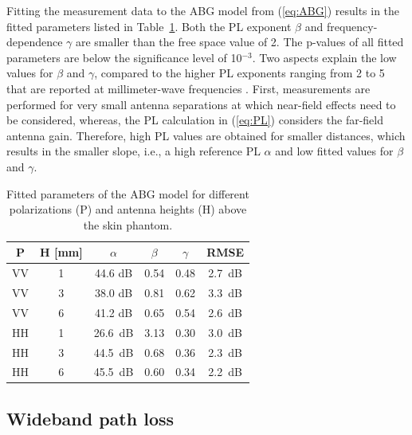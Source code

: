 \documentclass[preprint]{rsl}
\begin{document}
Fitting the measurement data to the ABG model from (\ref{eq:ABG}) results in the fitted parameters listed in Table~\ref{table:ABG}. 
Both the PL exponent $\beta$ and frequency-dependence $\gamma$ are smaller than the free space value of 2. 
The p-values of all fitted parameters are below the significance level of 10$^{-3}$. 
Two aspects explain the low values for $\beta$ and $\gamma$, compared to the higher PL exponents ranging from 2 to 5 that are reported at millimeter-wave frequencies \cite{Petrillo2014, Aminzadeh2021_tap}. 
First, measurements are performed for very small antenna separations at which near-field effects need to be considered, whereas, the PL calculation in (\ref{eq:PL}) considers the far-field antenna gain.
Therefore, high PL values are obtained for smaller distances, which results in the smaller slope, i.e., a high reference PL $\alpha$ and low fitted values for $\beta$ and $\gamma$.
\begin{table}[tb]
  \caption{Fitted parameters of the ABG model for different polarizations (P) and antenna heights (H) above the skin phantom.}
  \label{table:ABG}
  \begin{center}
    \begin{tabular}{cc|cccc}
      P & H [mm] & $\alpha$ & $\beta$ & $\gamma$ & RMSE \\
      \hline
      VV & 1 & 44.6 dB & 0.54 & 0.48 & 2.7~dB \\
      VV & 3 & 38.0 dB & 0.81 & 0.62 & 3.3~dB \\
      VV & 6 & 41.2 dB & 0.65 & 0.54 & 2.6~dB \\
      HH & 1 & 26.6~dB & 3.13 & 0.30 & 3.0~dB \\
      HH & 3 & 44.5~dB & 0.68 & 0.36 & 2.3~dB \\
      HH & 6 & 45.5~dB & 0.60 & 0.34 & 2.2~dB \\
    \end{tabular}
  \end{center}
\end{table}

\subsection{Wideband path loss}
\end{document}
